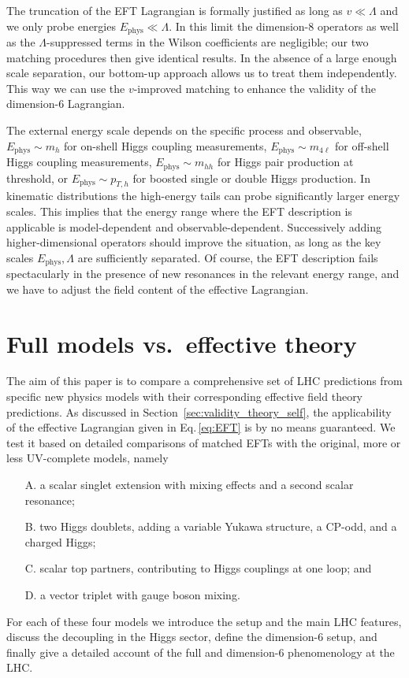 The truncation of the EFT Lagrangian is formally justified as long as
$v \ll \Lambda$ and we only probe energies $E_{\text{phys}} \ll
\Lambda$.  In this limit the dimension-8 operators as well as the
$\Lambda$-suppressed terms in the Wilson coefficients are negligible;
our two matching procedures then give identical results.  In the
absence of a large enough scale separation, our bottom-up approach
allows us to treat them independently. This way we can use the
$v$-improved matching to enhance the validity of the dimension-6
Lagrangian.

The external energy scale depends on the specific process and
observable, \eg $E_{\text{phys}} \sim m_h$ for on-shell Higgs coupling
measurements, $E_{\text{phys}} \sim m_{4 \ell}$ for off-shell Higgs
coupling measurements, $E_{\text{phys}} \sim m_{hh}$ for Higgs pair
production at threshold, or $E_{\text{phys}} \sim p_{T,h}$ for boosted
single or double Higgs production. In kinematic distributions the
high-energy tails can probe significantly larger energy scales.  This
implies that the energy range where the EFT description is applicable
is model-dependent and observable-dependent. Successively adding
higher-dimensional operators should improve the situation, as long as
the key scales $E_{\text{phys}}, \Lambda$ are sufficiently
separated. Of course, the EFT description fails spectacularly in the
presence of new resonances in the relevant energy range, and we have
to adjust the field content of the effective Lagrangian.



\section{Full models vs.\ effective theory}

The aim of this paper is to compare a comprehensive set of LHC
predictions from specific new physics models with their corresponding
effective field theory predictions.  As discussed in
Section~\ref{sec:validity_theory_self}, the applicability of the effective
Lagrangian given in Eq.\,\eqref{eq:EFT} is by no means guaranteed. We
test it based on detailed comparisons of matched EFTs with the
original, more or less UV-complete models, namely
%
\begin{itemize}
\item[A.] a scalar singlet extension with mixing effects and a second
scalar resonance;
\item[B.] two Higgs doublets, adding a variable Yukawa structure, a
CP-odd, and a charged Higgs;
\item[C.] scalar top partners, contributing to Higgs couplings at one
loop; and
\item[D.] a vector triplet with gauge boson mixing.
\end{itemize}
%
For each of these four models we introduce the setup and the main LHC
features, discuss the decoupling in the Higgs sector, define the
dimension-6 setup, and finally give a detailed account of the full and
dimension-6 phenomenology at the LHC.\medskip

